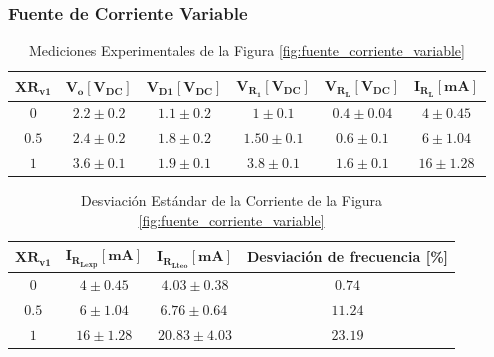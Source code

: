     \subsubsection{Fuente de Corriente Variable}

        \begin{table}[H]
          \centering
          \begin{tabular}{|c|c|c|c|c|c|}
            \hline
            $\mathbf{XR_{v1}}$ & $\mathbf{V_o [V_{DC}]}$ & $\mathbf{V_{D1} [V_{DC}]}$ & $\mathbf{V_{R_1} [V_{DC}]}$ & $\mathbf{V_{R_L} [V_{DC}]}$ & $\mathbf{I_{R_L} [mA]}$ \\
            \hline
            $0$ & $2.2 \pm 0.2$ & $1.1 \pm 0.2$ & $1 \pm 0.1$ & $0.4 \pm 0.04$ & $4 \pm 0.45$ \\
            \hline
            $0.5$ & $2.4 \pm 0.2$ & $1.8 \pm 0.2$ & $1.50 \pm 0.1$ & $0.6 \pm 0.1$ & $6 \pm 1.04$ \\
            \hline
            $1$ & $3.6 \pm 0.1$ & $1.9 \pm 0.1$ & $3.8 \pm 0.1$ & $1.6 \pm 0.1$ & $16 \pm 1.28$ \\
            \hline
          \end{tabular}
          \caption{Mediciones Experimentales de la Figura \ref{fig:fuente_corriente_variable}}
          \label{tab:exp_fuente_corriente_variable}
        \end{table}

        \begin{table}[H]
              \centering
              \begin{tabular}{|c|c|c|c|}
                \hline
                $\mathbf{XR_{v1}}$ & $\mathbf{I_{R_{Lexp}} [mA]}$ & $\mathbf{I_{R_{Lteo}} [mA]}$ & \textbf{Desviación de frecuencia [\%]} \\
                \hline
                $0$ & $4 \pm 0.45$ & $4.03 \pm 0.38 $ & $0.74$ \\
                \hline
                $0.5$ &  $6 \pm 1.04$   & $6.76 \pm 0.64 \, $ & $11.24$ \\
                \hline
                $1$ & $16 \pm 1.28$ & $20.83 \pm 4.03 $ & $23.19$ \\
                \hline
              \end{tabular}
              \caption{Desviación Estándar de la Corriente de la Figura \ref{fig:fuente_corriente_variable}}
                \label{tab:desv_fuente_corriente_variable}
        \end{table}


    
\newpage
